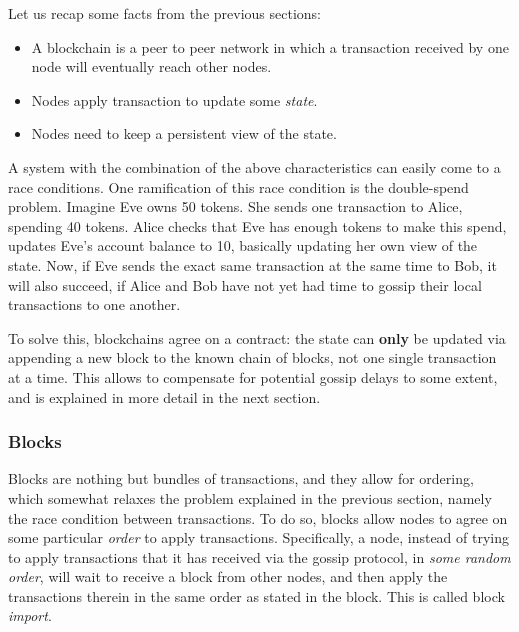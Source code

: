 Let us recap some facts from the previous sections:

\begin{itemize}
	\item A blockchain is a peer to peer network in which a transaction received by one node will
	eventually reach other nodes.
	\item Nodes apply transaction to update some \textit{state}.
	\item Nodes need to keep a persistent view of the state.
\end{itemize}

A system with the combination of the above characteristics can easily come to a race conditions. One
ramification of this race condition is the double-spend problem. Imagine Eve owns 50 tokens. She
sends one transaction to Alice, spending 40 tokens. Alice checks that Eve has enough tokens to make
this spend, updates Eve's account balance to 10, basically updating her own view of the state. Now,
if Eve sends the exact same transaction at the same time to Bob, it will also succeed, if Alice and
Bob have not yet had time to gossip their local transactions to one another.

To solve this, blockchains agree on a contract: the state can \textbf{only} be updated via appending
a new block to the known chain of blocks, not one single transaction at a time. This allows to
compensate for potential gossip delays to some extent, and is explained in more detail in the next
section.

\subsubsection{Blocks} \label{chap_bg:subsec:block}


Blocks are nothing but bundles of transactions, and they allow for ordering, which somewhat relaxes
the problem explained in the previous section, namely the race condition between transactions. To do
so, blocks allow nodes to agree on some particular \textit{order} to apply transactions.
Specifically, a node, instead of trying to apply transactions that it has received via the gossip
protocol, in \textit{some random order}, will wait to receive a block from other nodes, and then
apply the transactions therein in the same order as stated in the block. This is called block
\textit{import}.

